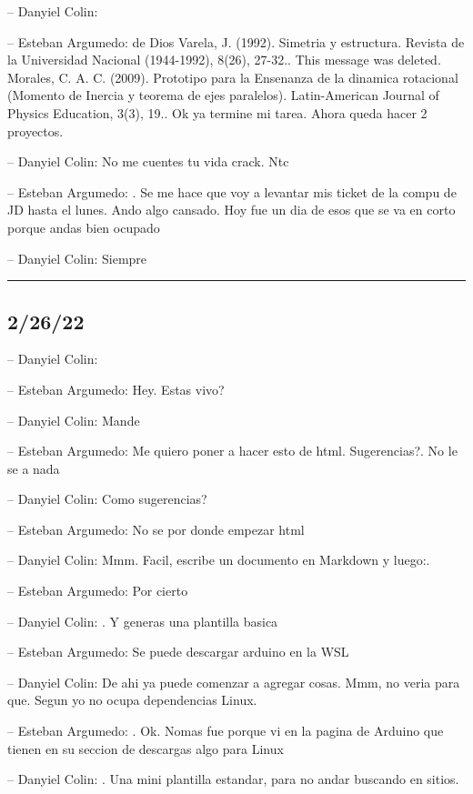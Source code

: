 -- Danyiel Colin:

-- Esteban Argumedo: de Dios Varela, J. (1992). Simetria y estructura.
Revista de la Universidad Nacional (1944-1992), 8(26), 27-32.. This
message was deleted. Morales, C. A. C. (2009). Prototipo para la
Ensenanza de la dinamica rotacional (Momento de Inercia y teorema de
ejes paralelos). Latin-American Journal of Physics Education, 3(3), 19..
Ok ya termine mi tarea. Ahora queda hacer 2 proyectos.

-- Danyiel Colin: No me cuentes tu vida crack. Ntc

-- Esteban Argumedo: . Se me hace que voy a levantar mis ticket de la
compu de JD hasta el lunes. Ando algo cansado. Hoy fue un dia de esos
que se va en corto porque andas bien ocupado

-- Danyiel Colin: Siempre

\begin{center}\rule{0.5\linewidth}{0.5pt}\end{center}

\hypertarget{section-18}{%
\subsection{2/26/22}\label{section-18}}

-- Danyiel Colin:

-- Esteban Argumedo: Hey. Estas vivo?

-- Danyiel Colin: Mande

-- Esteban Argumedo: Me quiero poner a hacer esto de html. Sugerencias?.
No le se a nada

-- Danyiel Colin: Como sugerencias?

-- Esteban Argumedo: No se por donde empezar html

-- Danyiel Colin: Mmm. Facil, escribe un documento en Markdown y luego:.

-- Esteban Argumedo: Por cierto

-- Danyiel Colin: . Y generas una plantilla basica

-- Esteban Argumedo: Se puede descargar arduino en la WSL

-- Danyiel Colin: De ahi ya puede comenzar a agregar cosas. Mmm, no
veria para que. Segun yo no ocupa dependencias Linux.

-- Esteban Argumedo: . Ok. Nomas fue porque vi en la pagina de Arduino
que tienen en su seccion de descargas algo para Linux

-- Danyiel Colin: . Una mini plantilla estandar, para no andar buscando
en sitios.

